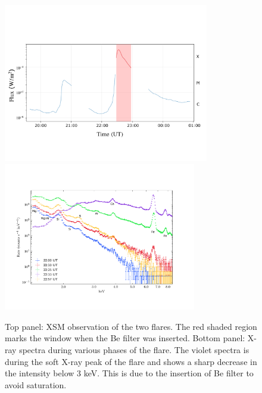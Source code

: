 \documentclass[12pt]{article}
\begin{document}
\begin{figure}
\centering
    \includegraphics[trim={0.5cm 3.3cm 0.8cm 4cm}, clip, width=0.8\textwidth]{xsm_lc.pdf} \\
    \includegraphics[trim={1.8cm 2.5cm 3cm 3cm},clip,width=0.75\textwidth]{xsm_spec.pdf}
    \caption{Top panel: XSM observation of the two flares. The red shaded region marks the window when the Be filter was inserted. Bottom panel: X-ray spectra during various phases of the flare. The violet spectra is during the soft X-ray peak of the flare and shows a sharp decrease in the intensity below 3 keV. This is due to the insertion of Be filter to avoid saturation.}
    \label{fig:xsm-obs}
\end{figure}
\end{document}
